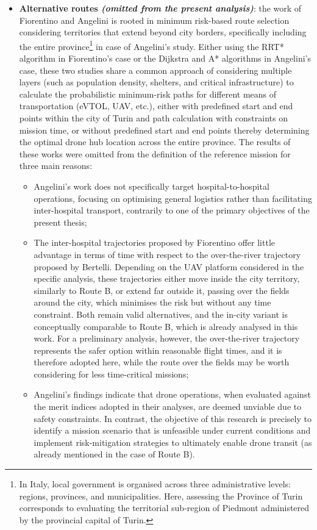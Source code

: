 \begin{itemize}
    \item \textbf{Alternative routes \textit{(omitted from the present analysis)}}: the work of Fiorentino \cite{Fiorentino2021} and Angelini \cite{Angelini2024ICAS} is rooted in minimum risk-based route selection considering territories that extend beyond city borders, specifically including the entire province\footnote{In Italy, local government is organised across three administrative levels: regions, provinces, and municipalities. Here, assessing the Province of Turin corresponds to evaluating the territorial sub-region of Piedmont administered by the provincial capital of Turin.} in case of Angelini's study. Either using the RRT* algorithm in Fiorentino's case or the Dijkstra and A* algorithms in Angelini's case, these two studies share a common approach of considering multiple layers (such as population density, shelters, and critical infrastructure) to calculate the probabilistic minimum-risk paths for different means of transportation (eVTOL, UAV, etc.), either with predefined start and end points within the city of Turin and path calculation with constraints on mission time, or without predefined start and end points thereby determining the optimal drone hub location across the entire province. The results of these works were omitted from the definition of the reference mission for three main reasons:
    \begin{itemize}
        \item Angelini's work does not specifically target hospital-to-hospital operations, focusing on optimising general logistics rather than facilitating inter-hospital transport, contrarily to one of the primary objectives of the present thesis;
        \item The inter-hospital trajectories proposed by Fiorentino offer little advantage in terms of time with respect to the over-the-river trajectory proposed by Bertelli. Depending on the UAV platform considered in the specific analysis, these trajectories either move inside the city territory, similarly to Route B, or extend far outside it, passing over the fields around the city, which minimises the risk but without any time constraint. Both remain valid alternatives, and the in-city variant is conceptually comparable to Route B, which is already analysed in this work. For a preliminary analysis, however, the over-the-river trajectory represents the safer option within reasonable flight times, and it is therefore adopted here, while the route over the fields may be worth considering for less time-critical missions;
        \item Angelini's findings indicate that drone operations, when evaluated against the merit indices adopted in their analyses, are deemed unviable due to safety constraints. In contrast, the objective of this research is precisely to identify a mission scenario that is unfeasible under current conditions and implement risk-mitigation strategies to ultimately enable drone transit (as already mentioned in the case of Route B).
    \end{itemize}
\end{itemize}


